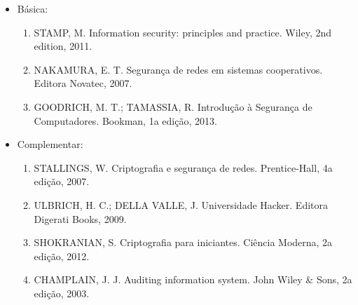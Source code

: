 \begin{itemize}

\item Básica:
    \begin{enumerate}

    \item STAMP, M.
          Information security: principles and practice.
          Wiley, 2nd edition, 2011.

    \item NAKAMURA, E. T.
          Segurança de redes em sistemas cooperativos.
          Editora Novatec, 2007.

    \item GOODRICH, M. T.; TAMASSIA, R.
          Introdução à Segurança de Computadores.
          Bookman, 1a edição, 2013.

    \end{enumerate}

\item Complementar:
    \begin{enumerate}

    \item STALLINGS, W.
          Criptografia e segurança de redes.
          Prentice-Hall, 4a edição, 2007.

    \item ULBRICH, H. C.; DELLA VALLE, J.
          Universidade Hacker.
          Editora Digerati Books, 2009.

    \item SHOKRANIAN, S.
          Criptografia para iniciantes.
          Ciência Moderna, 2a edição, 2012.

    \item CHAMPLAIN, J. J.
          Auditing information system.
          John Wiley \& Sons, 2a edição, 2003.

    \end{enumerate}

\end{itemize}
